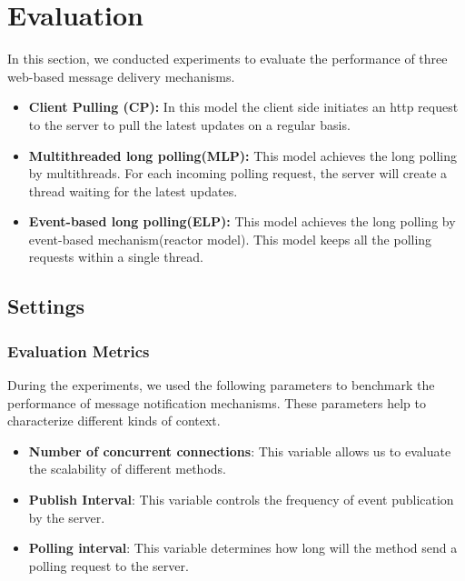 \section {Evaluation\\}

In this section, we conducted experiments to evaluate the performance of 
three web-based message delivery mechanisms. 

\begin{itemize}
    \item {\bf Client Pulling (CP): } In this model the client side initiates 
        an http request to the server to pull the latest updates on a regular 
        basis.
    \item {\bf Multithreaded long polling(MLP): } This model achieves the 
        long polling by multithreads. For each incoming polling request, the
        server will create a thread waiting for the latest updates.
    \item {\bf Event-based long polling(ELP): } This model achieves the long
        polling by event-based mechanism(reactor model). This model keeps all
        the polling requests within a single thread.
\end{itemize}

\subsection{Settings \\}

\subsubsection{Evaluation Metrics \\}
During the experiments, we used the following parameters to benchmark 
the performance of message notification mechanisms. These parameters help 
to characterize different kinds of context.

\begin{itemize}
    \item {\bf Number of concurrent connections}: This variable allows us 
         to evaluate the scalability of different methods.
    \item {\bf Publish Interval}: This variable controls the frequency of 
         event publication by the server. 
    \item {\bf Polling interval}: This variable determines how long will 
        the method send a polling request to the server.
\end{itemize}

